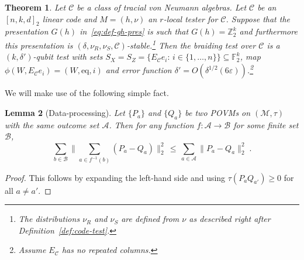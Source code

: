\documentclass[11pt]{article}
\newtheorem{theorem}{Theorem}[section]
\newtheorem{lemma}[theorem]{Lemma}
\theoremstyle{definition}
\newcommand{\code}{\mathscr{C}}
\newcommand{\field}{\mathbb{F}_2}
\newcommand{\Z}{\ensuremath{\mathbb{Z}}}
\newcommand{\mA}{\ensuremath{\mathcal{A}}}
\newcommand{\mB}{\ensuremath{\mathcal{B}}}
\newcommand{\mC}{\ensuremath{\mathcal{C}}}
\newcommand{\mM}{\ensuremath{\mathcal{M}}}
\newcommand{\eps}{\varepsilon}
\newcommand{\eq}{\mathrm{eq}}
\begin{document}
\begin{theorem}\label{thm:braiding}
Let $\mC$ be a class of tracial von Neumann algebras. Let $\code$ be an $[n,k,d]_2$ linear code and $M=(h,\nu)$ an $r$-local tester for $\code$. Suppose that the presentation $G(h)$ in~\eqref{eq:def-gh-pres} is such that $G(h)=\Z_2^k$ and furthermore this presentation is $(\delta,\nu_R,\nu_S,\mC)$-stable.\footnote{The distributions $\nu_R$ and $\nu_S$ are defined from $\nu$ as described right after Definition~\ref{def:code-test}.} Then the braiding test over $\code$ is a $(k,\delta')$-qubit test with sets $S_X=S_Z=\{E_\code e_i:\,i\in\{1,\ldots,n\}\}\subseteq \field^k$, map $\phi(W,E_\code e_i)=(W,\eq,i)$ and error function $\delta' = O(\delta^{1/2}(6\eps))$.\footnote{Assume $E_\code$ has no repeated columns.} 
\end{theorem}



We will make use of the following simple fact. 


\begin{lemma}[Data-processing]\label{lem:dp}
Let $\{P_a\}$ and $\{Q_a\}$ be two POVMs on $(\mM,\tau)$ with the same outcome set $\mA$. Then for any function $f:\mA\to \mB$ for some finite set $\mB$, 
\begin{equation}\label{eq:dp}
\sum_{b\in \mB} \Big\| \sum_{a\in f^{-1}(b)} (P_a-Q_a) \Big\|_2^2 \,\leq\, \sum_{a\in \mA} \big\| P_a-Q_a\big\|_2^2\;.
\end{equation}
\end{lemma}

\begin{proof}
This follows by expanding the left-hand side and using $\tau(P_aQ_{a'})\geq 0$ for all $a\neq a'$. 
\end{proof}
\end{document}
